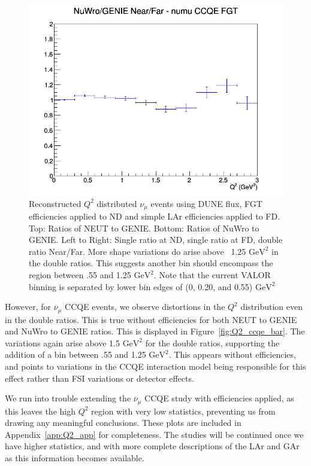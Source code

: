 \documentclass[12pt]{article}
\begin{document}
\begin{figure}[h]
\endminipage
{}
\includegraphics[width=\linewidth]{eff_Q2/FGT/ratios/CCQE_NuWro_GENIE_numu_NF_Q2.png}
\endminipage
\caption{Reconstructed $Q^2$ distributed $\nu_{\mu}$ events using DUNE flux, FGT efficiencies applied to ND and simple LAr efficiencies applied to FD. Top: Ratios of NEUT to GENIE. Bottom: Ratios of NuWro to GENIE. Left to Right: Single ratio at ND, single ratio at FD, double ratio Near/Far. More shape variations do arise above ~1.25 $\textrm{GeV}^2$ in the double ratios. This suggests another bin should encompass the region between .55 and 1.25 $\textrm{GeV}^2$. Note that the current VALOR binning is separated by lower bin edges of (0, 0.20, and 0.55) $\textrm{GeV}^2$}
\label{fig:Q2_ccqe_FGT_eff}
\end{figure}
\FloatBarrier


However, for $\overline{\nu}_{\mu}$ CCQE events, we observe distortions in the $Q^2$ distribution even in the double ratios. This is true without efficiencies for both NEUT to GENIE and NuWro to GENIE ratios. This is displayed in Figure~\ref{fig:Q2_ccqe_bar}. The variations again arise above 1.5 $\textrm{GeV}^2$ for the double ratios, supporting the addition of a bin between .55 and 1.25 $\textrm{GeV}^2$. This appears without efficiencies, and points to variations in the CCQE interaction model being responsible for this effect rather than FSI variations or detector effects.

We run into trouble extending the $\overline{\nu}_{\mu}$ CCQE study with efficiencies applied, as this leaves the high $Q^2$ region with very low statistics, preventing us from drawing any meaningful conclusions. These plots are included in Appendix~\ref{app:Q2_app} for completeness. The studies will be continued once we have higher statistics, and with more complete descriptions of the LAr and GAr as this information becomes available.
\end{document}
